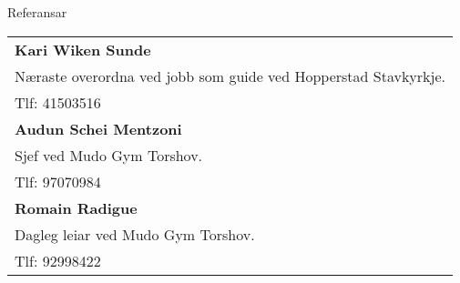 
\prefix{}
\begin{rubric}{Referansar}
    \begin{tabular}{l}
        \textbf{Kari Wiken Sunde}\\
        Næraste overordna ved jobb som guide ved Hopperstad Stavkyrkje.\\
        Tlf: 41503516\\[0.5em]
        
        \textbf{Audun Schei Mentzoni}\\
        Sjef ved Mudo Gym Torshov.\\
        Tlf: 97070984\\[0.5em]
        
        \textbf{Romain Radigue}\\
        Dagleg leiar ved Mudo Gym Torshov.\\
        Tlf: 92998422
    \end{tabular}
\end{rubric}